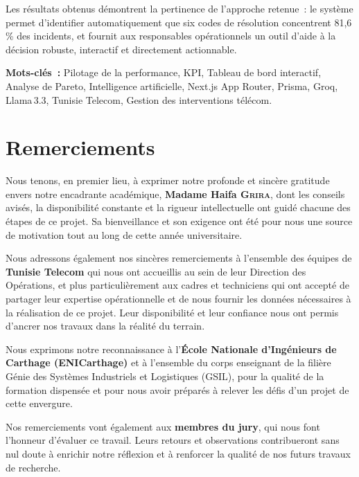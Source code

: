 \documentclass[10pt,a4paper]{report}
\begin{document}
Les résultats obtenus démontrent la pertinence de l'approche retenue~: le système permet d'identifier automatiquement que six codes de résolution concentrent 81,6\,\% des incidents, et fournit aux responsables opérationnels un outil d'aide à la décision robuste, interactif et directement actionnable.

\medskip
\noindent\textbf{Mots-clés~:} Pilotage de la performance, KPI, Tableau de bord interactif, Analyse de Pareto, Intelligence artificielle, Next.js App Router, Prisma, Groq, Llama\,3.3, Tunisie Telecom, Gestion des interventions télécom.

\chapter*{Remerciements}
\thispagestyle{fancy}

Nous tenons, en premier lieu, à exprimer notre profonde et sincère gratitude envers notre encadrante académique, \textbf{Madame Haifa \textsc{Grira}}, dont les conseils avisés, la disponibilité constante et la rigueur intellectuelle ont guidé chacune des étapes de ce projet. Sa bienveillance et son exigence ont été pour nous une source de motivation tout au long de cette année universitaire.

Nous adressons également nos sincères remerciements à l'ensemble des équipes de \textbf{Tunisie Telecom} qui nous ont accueillis au sein de leur Direction des Opérations, et plus particulièrement aux cadres et techniciens qui ont accepté de partager leur expertise opérationnelle et de nous fournir les données nécessaires à la réalisation de ce projet. Leur disponibilité et leur confiance nous ont permis d'ancrer nos travaux dans la réalité du terrain.

Nous exprimons notre reconnaissance à l'\textbf{École Nationale d'Ingénieurs de Carthage (ENICarthage)} et à l'ensemble du corps enseignant de la filière Génie des Systèmes Industriels et Logistiques (GSIL), pour la qualité de la formation dispensée et pour nous avoir préparés à relever les défis d'un projet de cette envergure.

Nos remerciements vont également aux \textbf{membres du jury}, qui nous font l'honneur d'évaluer ce travail. Leurs retours et observations contribueront sans nul doute à enrichir notre réflexion et à renforcer la qualité de nos futurs travaux de recherche.
\end{document}
